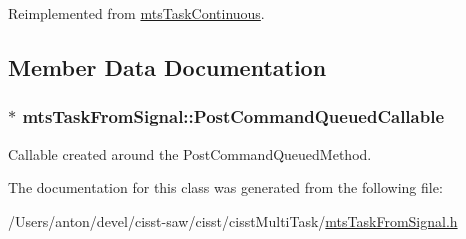 Reimplemented from \hyperlink{classmts_task_continuous_ae7335e46dbed0ab3e1e44b628c438319}{mts\+Task\+Continuous}.



\subsection{Member Data Documentation}
\hypertarget{classmts_task_from_signal_a9ca1f20e2ea7595968e75ff793722dfc}{}
\subsubsection[{Post\+Command\+Queued\+Callable}]{$\ast$ mts\+Task\+From\+Signal\+::\+Post\+Command\+Queued\+Callable\hspace{0.3cm}{\ttfamily [protected]}}\label{classmts_task_from_signal_a9ca1f20e2ea7595968e75ff793722dfc}
Callable created around the Post\+Command\+Queued\+Method. 

The documentation for this class was generated from the following file\+:\begin{DoxyCompactItemize}
\item 
/\+Users/anton/devel/cisst-\/saw/cisst/cisst\+Multi\+Task/\hyperlink{mts_task_from_signal_8h}{mts\+Task\+From\+Signal.\+h}\end{DoxyCompactItemize}
